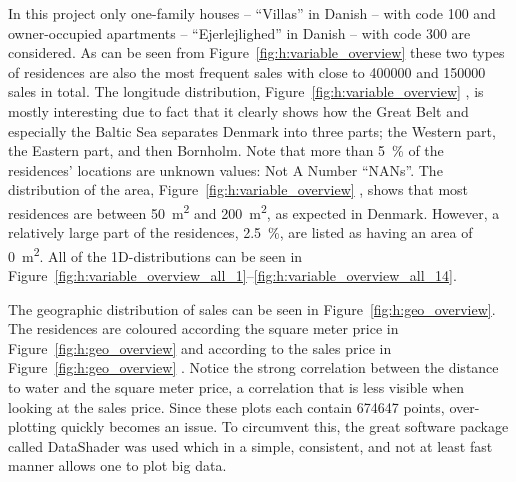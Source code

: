 \documentclass[a4paper, twoside, nobib]{tufte-book}
\newcommand{\q}[1]{``#1''}
\newcommand{\autocite}[1]{\citep{#1}}
\begin{document}
In this project only one-family houses -- \q{Villas} in Danish -- with code \num{100} and owner-occupied apartments -- \q{Ejerlejlighed} in Danish -- with code 300 are considered. As can be seen from Figure~\ref{fig:h:variable_overview}  these two types of residences are also the most frequent sales with close to \num{400000} and \num{150000} sales in total. The longitude distribution, Figure~\ref{fig:h:variable_overview} , is mostly interesting due to fact that it clearly shows how the Great Belt and especially the Baltic Sea separates Denmark into three parts; the Western part, the Eastern part, and then Bornholm. Note that more than \SI{5}{\percent} of the residences' locations are unknown values: Not A Number \q{NANs}. The distribution of the area, Figure~\ref{fig:h:variable_overview} , shows that most residences are between \SI{50}{\meter^2} and \SI{200}{\meter^2}, as expected in Denmark. However, a relatively large part of the residences, \SI{2.5}{\percent}, are listed as having an area of \SI{0}{\meter^2}. All of the 1D-distributions can be seen in Figure~\ref{fig:h:variable_overview_all_1}--\ref{fig:h:variable_overview_all_14}. 

The geographic distribution of sales can be seen in Figure~\ref{fig:h:geo_overview}. The residences are coloured according the square meter price in Figure~\ref{fig:h:geo_overview}  and according to the sales price in Figure~\ref{fig:h:geo_overview} . Notice the strong correlation between the distance to water and the square meter price, a correlation that is less visible when looking at the sales price. Since these plots each contain \num{674647} points, over-plotting quickly becomes an issue. To circumvent this, the great software package called DataShader was used \autocite{bednarDatashaderRevealingStructure2019} which in a simple, consistent, and not at least fast manner allows one to plot big data.
\end{document}
